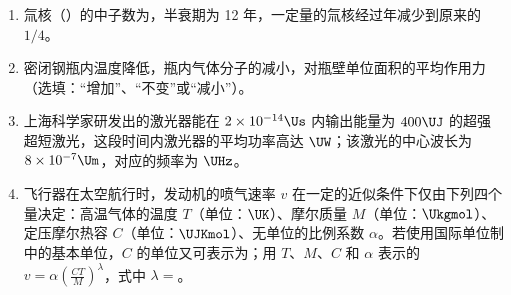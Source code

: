 \documentclass[\gkver]{gaokaozhenti}
\begin{document}
\begin{enumerate}
{由 $E=\frac{F}{q}=\frac{kQ}{r^{2}}$ 可知，$F-q$ 图中的点的斜率表示该点所在位置处的电场强度，且距离场源电荷 $Q$ 越远，斜率越小。正确选项为 B。
}

\item
氚核（）的中子数为，半衰期为 12 年，一定量的氚核经过年减少到原来的 $1/4$。

\item
密闭钢瓶内温度降低，瓶内气体分子的减小，对瓶壁单位面积的平均作用力（选填：“增加”、“不变”或“减小”）。

\item
上海科学家研发出的激光器能在 $2\times10^{-14}\Us$ 内输出能量为 $400\UJ$ 的超强超短激光，这段时间内激光器的平均功率高达 $\UW$；该激光的中心波长为 $8\times10^{-7}\Um$，对应的频率为 $\UHz$。

\item
飞行器在太空航行时，发动机的喷气速率 $v$ 在一定的近似条件下仅由下列四个量决定：高温气体的温度 $T$（单位：$\UK$）、摩尔质量 $M$（单位：$\Ukgmol$）、定压摩尔热容 $C$（单位：$\UJKmol$）、无单位的比例系数 $\alpha$。若使用国际单位制中的基本单位，$C$ 的单位又可表示为\tkanswer[4.6cm]{$\Ukgmqskmol$}；用 $T$、$M$、$C$ 和 $\alpha$ 表示的 $v=\alpha\left(\frac{CT}{M}\right)^{\lambda}$，式中 $\lambda=$。
\end{enumerate}
\end{document}
